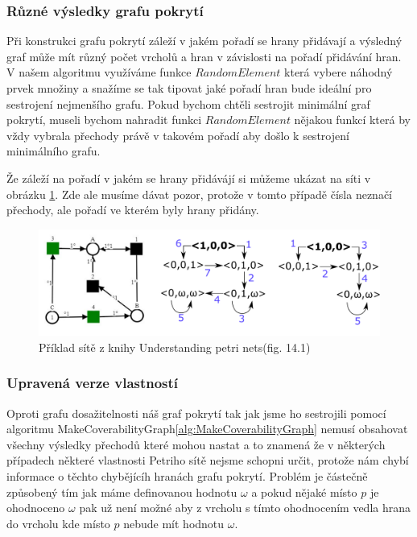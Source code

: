 \documentclass[
  biblatex,
  glossaries,
  index
]{kidiplom}
\begin{document}
\subsubsection{Různé výsledky grafu pokrytí}

Při konstrukci grafu pokrytí záleží v jakém pořadí se hrany přidávají
a výsledný graf může mít různý počet vrcholů a hran 
v závislosti na pořadí přidávání hran.
V našem algoritmu využíváme funkce $RandomElement$ která vybere 
náhodný prvek množiny a snažíme se tak tipovat jaké pořadí hran bude
ideální pro sestrojení nejmenšího grafu. 
Pokud bychom chtěli sestrojit minimální 
graf pokrytí, museli bychom nahradit funkci $RandomElement$ nějakou
funkcí která by vždy vybrala přechody právě 
v takovém pořadí aby došlo k sestrojení minimálního grafu.

Že záleží na pořadí v jakém se hrany přidávájí si můžeme ukázat na 
síti v obrázku \ref{fig:síť různé coverability}. Zde ale musíme 
dávat pozor, protože v tomto případě čísla neznačí přechody,
ale pořadí ve kterém byly hrany přidány.

\begin{figure}[h]
  \centering
  \includegraphics[width=\linewidth]{net_coverability_difference}
  \caption{Příklad sítě z knihy Understanding petri nets\cite{reisig2013understanding}(fig.  14.1) }\label{fig:síť různé coverability}
\end{figure}


\subsubsection{Upravená verze vlastností}\label{Upravená verze vlastností}

Oproti grafu dosažitelnosti náš graf pokrytí tak jak jsme ho sestrojili 
pomocí algoritmu MakeCoverabilityGraph\ref{alg:MakeCoverabilityGraph} 
nemusí obsahovat všechny výsledky přechodů které mohou nastat a to znamená 
že v některých případech některé vlastnosti Petriho sítě nejsme schopni určit, 
protože nám chybí informace o těchto chybějícíh hranách grafu pokrytí.
Problém je částečně způsobený tím jak máme definovanou hodnotu $\omega$ a pokud 
nějaké místo $p$ je ohodnoceno $\omega$ pak už není možné aby z vrcholu s tímto 
ohodnocením vedla hrana do vrcholu kde místo $p$ nebude mít hodnotu $\omega$.
\end{document}
